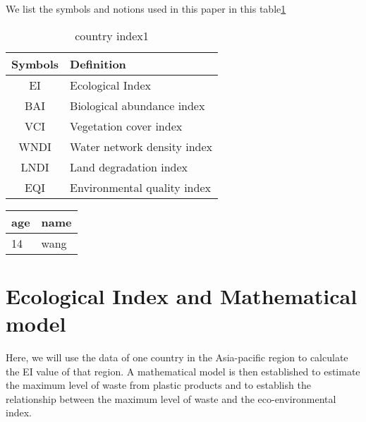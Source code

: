 \documentclass[12pt]{article}
\begin{document}
We list the symbols and notions used in this paper in this table\ref{biao1} 
\begin{table}[htb]
\centering
\caption{country index1}\label{biao1}
\begin{tabular}{c|p{18em}}
\hline
Symbols & Definition                  \\ \hline
EI      & Ecological Index            \\ \hline
BAI     & Biological abundance index  \\ \hline
VCI     & Vegetation cover index      \\ \hline
WNDI    & Water network density index \\ \hline
LNDI    & Land degradation index      \\ \hline
EQI     & Environmental quality index \\ \hline
\end{tabular}
\end{table}

\begin{table}[htb]
\centering
\begin{tabular}{l|p{18em}}
\hline
age & name \\ \hline
14  & wang \\ \hline
\end{tabular}
\end{table}

\section{Ecological Index and Mathematical model}
Here, we will use the data of one country in the Asia-pacific region to calculate the EI value of that region. A mathematical model is then established to estimate the maximum level of waste from plastic products and to establish the relationship between the maximum level of waste and the eco-environmental index.
\end{document}
